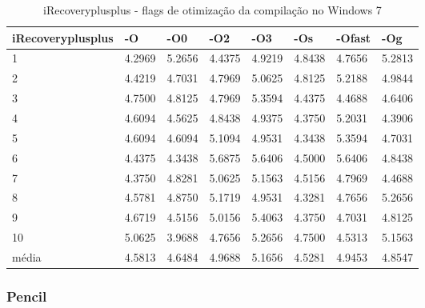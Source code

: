 \begin{table}[!ht]
\tiny
\centering
\caption{iRecoveryplusplus - flags de otimização da compilação no Windows 7}
\label{tab:otimizacao_compilacao:windows:irecoveryplusplus}
\begin{tabular}{llllllll}
\textbf{iRecoveryplusplus} & \textbf{-O}  & \textbf{-O0}   & \textbf{-O2} & \textbf{-O3} & \textbf{-Os} & \textbf{-Ofast} & \textbf{-Og} \\ \toprule
1                          &   4.2969     &    5.2656      & 4.4375       & 4.9219       &  4.8438      &   4.7656        &  5.2813  \\ 
2                          &   4.4219     &    4.7031      & 4.7969       & 5.0625       &  4.8125      &   5.2188        &  4.9844  \\ 
3                          &   4.7500     &    4.8125      & 4.7969       & 5.3594       &  4.4375      &   4.4688        &  4.6406  \\ 
4                          &   4.6094     &    4.5625      & 4.8438       & 4.9375       &  4.3750      &   5.2031        &  4.3906  \\ 
5                          &   4.6094     &    4.6094      & 5.1094       & 4.9531       &  4.3438      &   5.3594        &  4.7031  \\ 
6                          &   4.4375     &    4.3438      & 5.6875       & 5.6406       &  4.5000      &   5.6406        &  4.8438  \\ 
7                          &   4.3750     &    4.8281      & 5.0625       & 5.1563       &  4.5156      &   4.7969        &  4.4688  \\ 
8                          &   4.5781     &    4.8750      & 5.1719       & 4.9531       &  4.3281      &   4.7656        &  5.2656  \\ 
9                          &   4.6719     &    4.5156      & 5.0156       & 5.4063       &  4.3750      &   4.7031        &  4.8125  \\ 
10                         &   5.0625     &    3.9688      & 4.7656       & 5.2656       &  4.7500      &   4.5313        &  5.1563  \\ \bottomrule
média                      &   4.5813     &    4.6484      & 4.9688       & 5.1656       &  4.5281      &   4.9453        &  4.8547  \\ 
\end{tabular}
\end{table}

\clearpage
\subsubsection*{Pencil}

